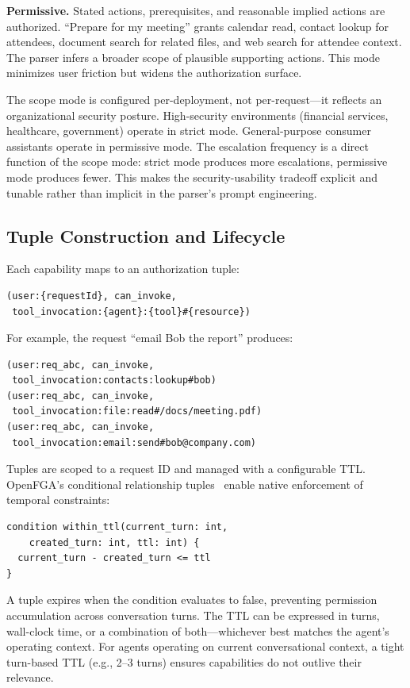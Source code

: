\documentclass[11pt]{article}
\begin{document}
\textbf{Permissive.} Stated actions, prerequisites, and reasonable implied actions are authorized. ``Prepare for my meeting'' grants calendar read, contact lookup for attendees, document search for related files, and web search for attendee context. The parser infers a broader scope of plausible supporting actions. This mode minimizes user friction but widens the authorization surface.

The scope mode is configured per-deployment, not per-request---it reflects an organizational security posture. High-security environments (financial services, healthcare, government) operate in strict mode. General-purpose consumer assistants operate in permissive mode. The escalation frequency is a direct function of the scope mode: strict mode produces more escalations, permissive mode produces fewer. This makes the security-usability tradeoff explicit and tunable rather than implicit in the parser's prompt engineering.

\subsection{Tuple Construction and Lifecycle}

Each capability maps to an authorization tuple:

\begin{lstlisting}[language={}]
(user:{requestId}, can_invoke,
 tool_invocation:{agent}:{tool}#{resource})
\end{lstlisting}

For example, the request ``email Bob the report'' produces:

\begin{lstlisting}[language={}]
(user:req_abc, can_invoke,
 tool_invocation:contacts:lookup#bob)
(user:req_abc, can_invoke,
 tool_invocation:file:read#/docs/meeting.pdf)
(user:req_abc, can_invoke,
 tool_invocation:email:send#bob@company.com)
\end{lstlisting}

Tuples are scoped to a request ID and managed with a configurable TTL. OpenFGA's conditional relationship tuples~\cite{openfga} enable native enforcement of temporal constraints:

\begin{lstlisting}[language={}]
condition within_ttl(current_turn: int,
    created_turn: int, ttl: int) {
  current_turn - created_turn <= ttl
}
\end{lstlisting}

A tuple expires when the condition evaluates to false, preventing permission accumulation across conversation turns. The TTL can be expressed in turns, wall-clock time, or a combination of both---whichever best matches the agent's operating context. For agents operating on current conversational context, a tight turn-based TTL (e.g., 2--3 turns) ensures capabilities do not outlive their relevance.
\end{document}
